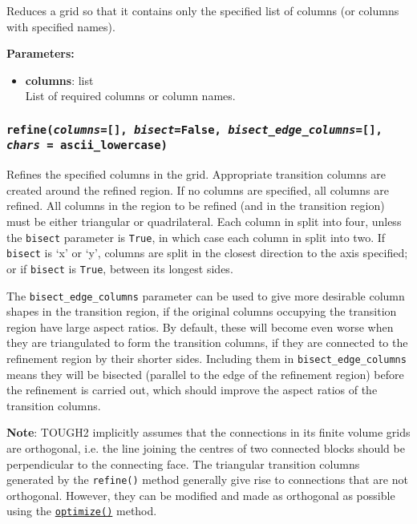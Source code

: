 Reduces a grid so that it contains only the specified list of columns (or columns with specified names).

\textbf{Parameters:}
\begin{itemize}
  \item \textbf{columns}: list\\
    List of required columns or column names.
\end{itemize}

\begin{snugshade}\subsubsection{\texttt{refine(\emph{columns}=[], \emph{bisect}=False, \emph{bisect\_edge\_columns}=[],\\
    \emph{chars} = ascii\_lowercase)}}\end{snugshade}
\label{sec:mulgrid:refine}

Refines the specified columns in the grid.  Appropriate transition columns are created around the refined region.  If no columns are specified, all columns are refined.  All columns in the region to be refined (and in the transition region) must be either triangular or quadrilateral.  Each column in split into four, unless the \texttt{bisect} parameter is \texttt{True}, in which case each column in split into two.  If \texttt{bisect} is `x' or `y', columns are split in the closest direction to the axis specified; or if \texttt{bisect} is \texttt{True}, between its longest sides.

The \texttt{bisect\_edge\_columns} parameter can be used to give more desirable column shapes in the transition region, if the original columns occupying the transition region have large aspect ratios.  By default, these will become even worse when they are triangulated to form the transition columns, if they are connected to the refinement region by their shorter sides.  Including them in \texttt{bisect\_edge\_columns} means they will be bisected (parallel to the edge of the refinement region) before the refinement is carried out, which should improve the aspect ratios of the transition columns.

\textbf{Note}: TOUGH2 implicitly assumes that the connections in its finite volume grids are orthogonal, i.e. the line joining the centres of two connected blocks should be perpendicular to the connecting face. The triangular transition columns generated by the \texttt{refine()} method generally give rise to connections that are not orthogonal. However, they can be modified and made as orthogonal as possible using the \hyperref[sec:mulgrid:optimize]{\texttt{optimize()}} method.

